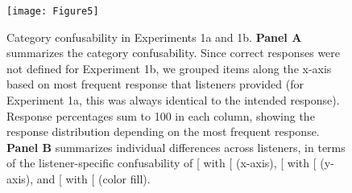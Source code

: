 \documentclass[preprint]{JASA}
\begin{document}
\begin{figure}[!ht]

{\centering \texttt{[image: Figure5]} 

}

\caption{Category confusability in Experiments 1a and 1b. \textbf{Panel A} summarizes the category confusability. Since correct responses were not defined for Experiment 1b, we grouped items along the x-axis based on most frequent response that listeners provided (for Experiment 1a, this was always identical to the intended response). Response percentages sum to 100 in each column, showing the response distribution depending on the most frequent response. \textbf{Panel B} summarizes individual differences across listeners, in terms of the listener-specific confusability of {[}\textipa{I}{]} with {[}\textipa{E}{]} (x-axis), {[}\textipa{E}{]} with {[}\textipa{ae}{]} (y-axis), and {[}\textipa{u}{]} with {[}\textipa{U}{]} (color fill).}\label{fig:Figure5}
\end{figure}
\end{document}

